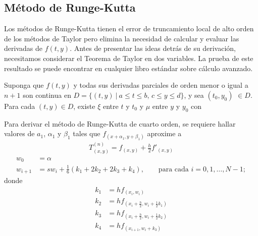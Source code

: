 \documentclass[english,spanish,Ce-table,Ce-theorem]{CabesHW}
\begin{document}
\vspace{2em}
\subsection{Método de Runge-Kutta}
Los métodos de Runge-Kutta tienen el error de truncamiento local de alto orden de los métodos de Taylor pero elimina la necesidad de calcular y evaluar las derivadas de $f(t, y)$. Antes de presentar las ideas detrás de su derivación, necesitamos considerar el Teorema de Taylor en dos variables. La prueba de este resultado se puede encontrar en cualquier libro estándar sobre cálculo avanzado.

\begin{theorem}
Suponga que $f (t, y)$ y todas sus derivadas parciales de orden menor o igual a $n + 1$ son continua en $ D = \{(t, y)\:|\:a \leq t \leq b,\, c \leq y \leq d\}$, y sea $(t_0,y_0)$ $\in D$. Para cada $(t, y) \in D$, existe $\xi$ entre $t$  y $t_0$ y $\mu$ entre  $y$ y $y_0$ con
\end{theorem}

Para derivar el método de Runge-Kutta de cuarto orden, se requiere hallar valores de $a_1$, $\alpha_1$ y $\beta_1$ tales que $f_{(x + \alpha_1, y + \beta_1)}$ aproxime a
\begin{align*}
    T^{(n)}_{(x, y)} = f_{(x, y)} + \frac{h}{2}f'_{(x, y)}
\end{align*}
\begin{align*}
    w_0 &= \alpha\\
    w_{i+1} &= sw_i + \frac{1}{6}(k_1 + 2k_2 + 2k_3 + k_4), \qquad \text{para cada $i= 0, 1, \ldots, N-1;$}
\end{align*}
donde
\begin{align*}
    k_1 &= hf_{(x_i, w_i)}\\
    k_2 &= hf_{(x_i + \frac{h}{2}, w_i + \frac{1}{2}k_1)}\\
    k_3 &= hf_{(x_i + \frac{h}{2}, w_i + \frac{1}{2}k_2)}\\
    k_4 &= hf_{(x_{i+1}, w_i + k_3)}
\end{align*}
\end{document}
